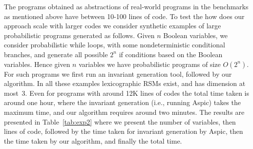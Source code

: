 \smallskip{} 
The programs obtained as abstractions of real-world programs in the benchmarks 
as mentioned above have between 10-100 lines of code. 
To test the how does our approach scale with larger codes we consider synthetic examples 
of large probabilistic programs generated as follows.
Given $n$ Boolean variables, we consider probabilistic while loops,
with some nondeterministic conditional branches, and generate all possible $2^n$ if conditions
based on the Boolean variables. 
Hence given $n$ variables we have probabilistic programs of size $O(2^n)$.
For such programs we first run an invariant generation tool, followed by our algorithm.
In all these examples lexicographic RSMs exist, and has dimension at most~3.
Even for programs with around 12K lines of codes the total time taken is around 
one hour, where the invariant generation (i.e., running Aspic) takes the maximum time, 
and our algorithm requires around two minutes.
The results are presented in Table~\ref{tab:exp2} where we present the number of 
variables, then lines of code, followed by the time taken for invariant generation
by Aspic, then the time taken by our algorithm, and finally the total time.






